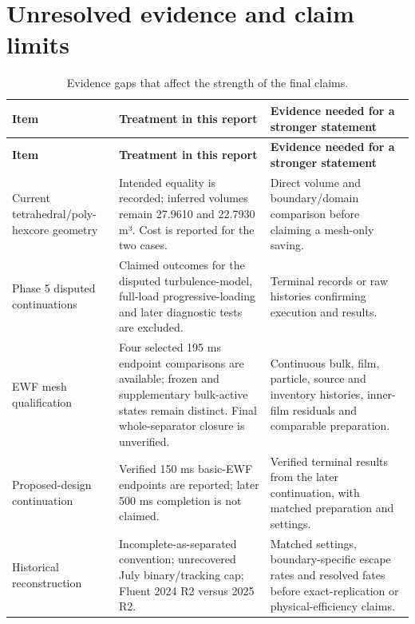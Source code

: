 \section{Unresolved evidence and claim limits}

\begin{longtable}{@{}>{\raggedright\arraybackslash}p{0.29000000\dimexpr\linewidth-4\tabcolsep\relax}>{\raggedright\arraybackslash}p{0.34000000\dimexpr\linewidth-4\tabcolsep\relax}>{\raggedright\arraybackslash}p{0.37000000\dimexpr\linewidth-4\tabcolsep\relax}@{}}
\caption{Evidence gaps that affect the strength of the final claims.}\label{tab:table-C.1}\\
\toprule
\textbf{Item} & \textbf{Treatment in this report} & \textbf{Evidence needed for a stronger statement} \\
\midrule
\endfirsthead
\toprule
\textbf{Item} & \textbf{Treatment in this report} & \textbf{Evidence needed for a stronger statement} \\
\midrule
\endhead
Current tetrahedral/poly-hexcore geometry & Intended equality is recorded; inferred volumes remain 27.9610 and 22.7930 m³. Cost is reported for the two cases. & Direct volume and boundary/domain comparison before claiming a mesh-only saving. \\
Phase 5 disputed continuations & Claimed outcomes for the disputed turbulence-model, full-load progressive-loading and later diagnostic tests are excluded. & Terminal records or raw histories confirming execution and results. \\
EWF mesh qualification & Four selected 195 ms endpoint comparisons are available; frozen and supplementary bulk-active states remain distinct. Final whole-separator closure is unverified. & Continuous bulk, film, particle, source and inventory histories, inner-film residuals and comparable preparation. \\
Proposed-design continuation & Verified 150 ms basic-EWF endpoints are reported; later 500 ms completion is not claimed. & Verified terminal results from the later continuation, with matched preparation and settings. \\
Historical reconstruction & Incomplete-as-separated convention; unrecovered July binary/tracking cap; Fluent 2024 R2 versus 2025 R2. & Matched settings, boundary-specific escape rates and resolved fates before exact-replication or physical-efficiency claims. \\
\bottomrule
\end{longtable}

